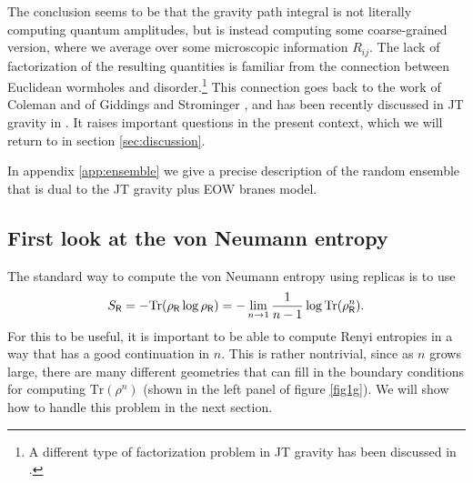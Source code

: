 \documentclass[11pt]{article}
\newcommand{\be}{\begin{equation}}
\newcommand{\ee}{\end{equation}}
\numberwithin{equation}{section}
\def\tr{\text{Tr}}
\begin{document}
The conclusion seems to be that the gravity path integral is not literally computing quantum amplitudes, but is instead computing some coarse-grained version, where we average over some microscopic information $R_{ij}$. The lack of factorization of the resulting quantities is familiar from the connection between Euclidean wormholes and disorder.\footnote{A different type of factorization problem in JT gravity has been discussed in \cite{Harlow:2018tqv,Lin:2018xkj,Jafferis:2019wkd}.} This connection goes back to the work of  Coleman \cite{Coleman:1988cy} and of Giddings and Strominger \cite{Giddings:1988cx}, and has been recently discussed in JT gravity in \cite{Saad:2019lba}. It raises important questions in the present context, which we will return to in section \ref{sec:discussion}.

In appendix \ref{app:ensemble} we give a precise description of the random ensemble that is dual to the JT gravity plus EOW branes model.


\subsection{First look at the von Neumann entropy}
The standard way to compute the von Neumann entropy using replicas is to use
\be
S_{\sf{R}} = -\tr(\rho_{\sf{R}}\log\rho_{\sf{R}})= -\lim_{n\to 1}\frac{1}{n-1}\log\tr(\rho_{\sf{R}}^n).
\ee
For this to be useful, it is important to be able to compute Renyi entropies in a way that has a good continuation in $n$. This is rather nontrivial, since as $n$ grows large, there are many different geometries that can fill in the boundary conditions for computing $\tr(\rho^n)$ (shown in the left panel of figure \ref{fig1g}). We will show how to handle this problem in the next section.
\end{document}
